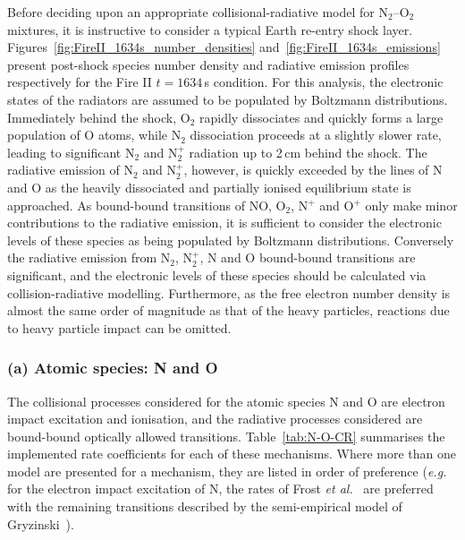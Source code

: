 {Before deciding upon an appropriate collisional-radiative model for N$_2$--O$_2$ mixtures, it is instructive to consider a typical Earth re-entry shock layer.
Figures~\ref{fig:FireII_1634s_number_densities} and~\ref{fig:FireII_1634s_emissions} present post-shock species number density and radiative emission profiles respectively for the Fire II $t=1634$\,s condition.
For this analysis, the electronic states of the radiators are assumed to be populated by Boltzmann distributions.
Immediately behind the shock, O$_2$ rapidly dissociates and quickly forms a large population of O atoms, while N$_2$ dissociation proceeds at a slightly slower rate, leading to significant N$_2$ and N$_2^+$ radiation up to 2\,cm behind the shock.
The radiative emission of N$_2$ and N$_2^+$, however, is quickly exceeded by the lines of N and O as the heavily dissociated and partially ionised equilibrium state is approached.
As bound-bound transitions of NO, O$_2$, N$^+$ and O$^+$ only make minor contributions to the radiative emission, it is sufficient to consider the electronic levels of these species as being populated by Boltzmann distributions.
Conversely the radiative emission from N$_2$, N$_2^+$, N and O bound-bound transitions are significant, and the electronic levels of these species should be calculated via collision-radiative modelling.
Furthermore, as the free electron number density is almost the same order of magnitude as that of the heavy particles, reactions due to heavy particle impact can be omitted.



\subsubsection{(a) Atomic species: N and O}

The collisional processes considered for the atomic species N and O are electron impact excitation and ionisation, and the radiative processes considered are bound-bound optically allowed transitions.
Table~\ref{tab:N-O-CR} summarises the implemented rate coefficients for each of these mechanisms.
Where more than one model are presented for a mechanism, they are listed in order of preference (\textit{e.g.} for the electron impact excitation of N, the rates of Frost \textit{et al.}~\cite{FAS+1998} are preferred with the remaining transitions described by the semi-empirical model of Gryzinski~\cite{Gryz59}).
\par

}
